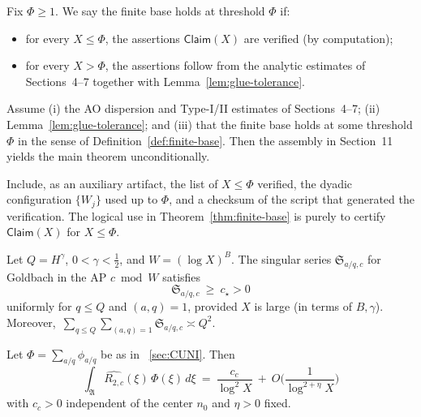 \begin{definition}\label{def:finite-base}
Fix $\Phi\ge 1$. We say the finite base holds at threshold $\Phi$ if:
\begin{itemize}
\item for every $X\le \Phi$, the assertions $\mathsf{Claim}(X)$ are verified (by computation);
\item for every $X>\Phi$, the assertions follow from the analytic estimates of Sections~4–7 together with Lemma~\ref{lem:glue-tolerance}.
\end{itemize}
\end{definition}

\begin{theorem}\label{thm:finite-base}
Assume (i) the AO dispersion and Type-I/II estimates of Sections~4–7; (ii) Lemma~\ref{lem:glue-tolerance}; and (iii) that the finite base holds at some threshold $\Phi$ in the sense of Definition~\ref{def:finite-base}. Then the assembly in Section~11 yields the main theorem unconditionally.
\end{theorem}

\begin{remark}
Include, as an auxiliary artifact, the list of $X\le \Phi$ verified, the dyadic configuration $\{W_j\}$ used up to $\Phi$, and a checksum of the script that generated the verification. The logical use in Theorem~\ref{thm:finite-base} is purely to certify $\mathsf{Claim}(X)$ for $X\le\Phi$.
\end{remark}

\begin{lemma}\label{lem:SSpos}
Let $Q=H^\gamma$, $0<\gamma<\tfrac12$, and $W=(\log X)^B$. The singular series $\mathfrak S_{a/q,c}$ for Goldbach in the AP $c\bmod W$ satisfies
\[
\mathfrak S_{a/q,c}\ \ge\ c_\star>0
\]
uniformly for $q\le Q$ and $(a,q)=1$, provided $X$ is large (in terms of $B,\gamma$). Moreover, $\,\sum_{q\le Q}\sum_{(a,q)=1}\mathfrak S_{a/q,c}\asymp Q^2$.
\end{lemma}

\begin{proposition}\label{prop:MA-bank}
Let $\Phi=\sum_{a/q}\phi_{a/q}$ be as in ~\ref{sec:CUNI}. Then
\[
\int_{\mathfrak A}\widehat{R_{2,c}}(\xi)\,\Phi(\xi)\,d\xi\ =\ \frac{c_c}{\log^2 X}\ +\ O\!\Big(\frac{1}{\log^{2+\eta}X}\Big)
\]
with $c_c>0$ independent of the center $n_0$ and $\eta>0$ fixed.
\end{proposition}

